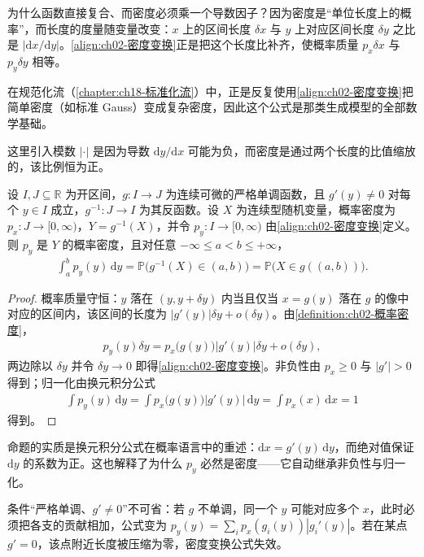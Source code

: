 \documentclass[../../main.tex]{subfiles}
\begin{document}
\begin{remark}
为什么函数直接复合、而密度必须乘一个导数因子？因为密度是“单位长度上的概率”，而长度的度量随变量改变：$x$ 上的区间长度 $\delta x$ 与 $y$ 上对应区间长度 $\delta y$ 之比是 $|\mathrm{d}x/\mathrm{d}y|$。\eqref{align:ch02-密度变换}正是把这个长度比补齐，使概率质量 $p_x\delta x$ 与 $p_y\delta y$ 相等。

在规范化流（\cref{chapter:ch18-标准化流}）中，正是反复使用\eqref{align:ch02-密度变换}把简单密度（如标准 Gauss）变成复杂密度，因此这个公式是那类生成模型的全部数学基础。
\end{remark}

这里引入模数 $|\cdot|$ 是因为导数 $\mathrm{d}y/\mathrm{d}x$ 可能为负，而密度是通过两个长度的比值缩放的，该比例恒为正。

\begin{proposition}[一元密度变换公式]\label{proposition:ch02-一元密度变换}
设 $I,J\subseteq\mathbb{R}$ 为开区间，$g:I\to J$ 为连续可微的严格单调函数，且 $g'(y)\neq0$ 对每个 $y\in I$ 成立，$g^{-1}:J\to I$ 为其反函数。设 $X$ 为连续型随机变量，概率密度为 $p_x:J\to[0,\infty)$，$Y=g^{-1}(X)$，并令 $p_y:I\to[0,\infty)$ 由\eqref{align:ch02-密度变换}定义。则 $p_y$ 是 $Y$ 的概率密度，且对任意 $-\infty\leqslant a<b\leqslant+\infty$，
\begin{align*}
  \int_{a}^{b}p_y(y)\,\mathrm{d}y=\mathbb{P}\big(g^{-1}(X)\in(a,b)\big)=\mathbb{P}\big(X\in g((a,b))\big).
\end{align*}
\end{proposition}

\begin{proof}
概率质量守恒：$y$ 落在 $(y,y+\delta y)$ 内当且仅当 $x=g(y)$ 落在 $g$ 的像中对应的区间内，该区间的长度为 $|g'(y)|\delta y+o(\delta y)$。由\cref{definition:ch02-概率密度}，
\begin{align*}
 p_y(y)\delta y = p_x\big(g(y)\big)\big|g'(y)\big|\delta y + o(\delta y) ,
\end{align*}
两边除以 $\delta y$ 并令 $\delta y\to0$ 即得\eqref{align:ch02-密度变换}。非负性由 $p_x\geqslant0$ 与 $|g'|>0$ 得到；归一化由换元积分公式
\begin{align*}
 \int p_y(y)\,\mathrm{d}y = \int p_x\big(g(y)\big)\big|g'(y)\big|\,\mathrm{d}y = \int p_x(x)\,\mathrm{d}x = 1
\end{align*}
得到。
\end{proof}

\begin{remark}
命题的实质是换元积分公式在概率语言中的重述：$\mathrm{d}x = g'(y)\,\mathrm{d}y$，而绝对值保证 $\mathrm{d}y$ 的系数为正。这也解释了为什么 $p_y$ 必然是密度——它自动继承非负性与归一化。

条件“严格单调、$g'\neq0$”不可省：若 $g$ 不单调，同一个 $y$ 可能对应多个 $x$，此时必须把各支的贡献相加，公式变为 $p_y(y)=\sum_i p_x(g_i(y))|g_i'(y)|$。若在某点 $g'=0$，该点附近长度被压缩为零，密度变换公式失效。
\end{remark}
\end{document}

